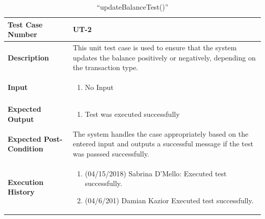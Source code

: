 \documentclass[12pt]{article}
\begin{document}
\begin{table}[H]
\caption{“updateBalanceTest()”}
\begin{center}
\begin{tabular}{|p{5.5cm}|p{11cm}|}
  \hline
  \bf Test Case Number & UT-2\\\hline
  \bf Description & 
  This unit test case is used to ensure that the system updates the balance positively or negatively, depending on the transaction type.\\\hline
  \bf Input &
  \begin{enumerate}
  \item No Input
  \end{enumerate}
  \\\hline
  \bf Expected Output &
  \begin{enumerate}
  \item Test was executed successfully
  \end{enumerate}
  \\\hline
  \bf Expected Post-Condition & 
  The system handles the case appropriately based on the entered input and outputs a successful message if the test was passsed successfully.
  \\\hline   
  \bf Execution History & 
  \begin{enumerate}
  \item (04/15/2018) Sabrina D’Mello: Executed test successfully.
  \item (04/6/201) Damian Kazior Executed test successfully.
  \end{enumerate}
  \\\hline
\end{tabular}
\end{center}
\end{table}
\end{document}
